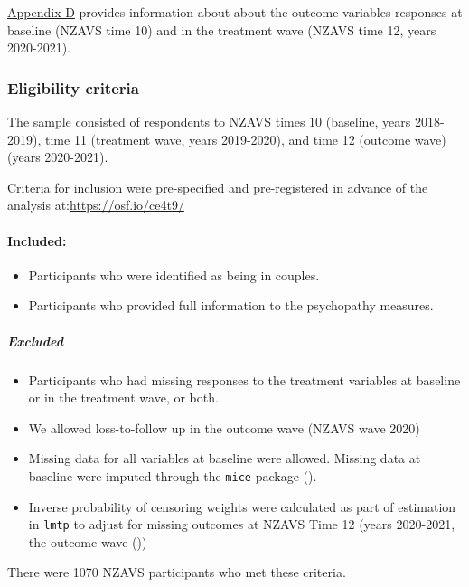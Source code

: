 \documentclass[
  singlecolumn]{article}
\let\oldparagraph\paragraph
\renewcommand{\paragraph}[1]{\oldparagraph{#1}\mbox{}}
\let\oldsubparagraph\subparagraph
\renewcommand{\subparagraph}[1]{\oldsubparagraph{#1}\mbox{}}
\providecommand{\tightlist}{%
  \setlength{\itemsep}{0pt}\setlength{\parskip}{0pt}}\usepackage{longtable,booktabs,array}
\begin{document}
\hyperref[appendix-outcomes]{Appendix D} provides information about
about the outcome variables responses at baseline (NZAVS time 10) and in
the treatment wave (NZAVS time 12, years 2020-2021).

\subsubsection{Eligibility criteria}\label{eligibility-criteria}

The sample consisted of respondents to NZAVS times 10 (baseline, years
2018-2019), time 11 (treatment wave, years 2019-2020), and time 12
(outcome wave) (years 2020-2021).

Criteria for inclusion were pre-specified and pre-registered in advance
of the analysis at:\url{https://osf.io/ce4t9/}

\paragraph{Included:}\label{included}

\begin{itemize}
\tightlist
\item
  Participants who were identified as being in couples.\\
\item
  Participants who provided full information to the psychopathy
  measures.
\end{itemize}

\subparagraph{Excluded}\label{excluded}

\begin{itemize}
\tightlist
\item
  Participants who had missing responses to the treatment variables at
  baseline or in the treatment wave, or both.
\item
  We allowed loss-to-follow up in the outcome wave (NZAVS wave 2020)
\item
  Missing data for all variables at baseline were allowed. Missing data
  at baseline were imputed through the \texttt{mice} package
  ().
\item
  Inverse probability of censoring weights were calculated as part of
  estimation in \texttt{lmtp} to adjust for missing outcomes at NZAVS
  Time 12 (years 2020-2021, the outcome wave
  ())
\end{itemize}

There were 1070 NZAVS participants who met these criteria.
\end{document}
